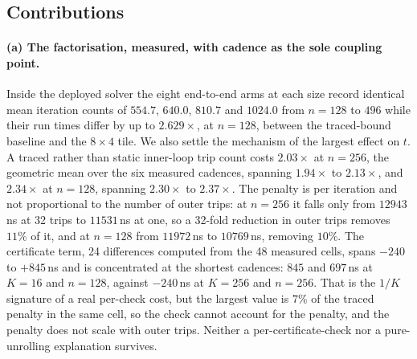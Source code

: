 \subsection{Contributions}
\label{sec:intro:contributions}

\paragraph{(a) The factorisation, measured, with cadence as the sole coupling
point.}
Inside the deployed solver the eight end-to-end arms at each size record
identical mean iteration counts of $554.7$, $640.0$, $810.7$ and $1024.0$ from
$n=128$ to $496$ while their run times differ by up to $2.629\times$, at
$n=128$, between the traced-bound baseline and the $8\times 4$ tile.
We also settle the mechanism of the largest effect on $t$. A traced rather than
static inner-loop trip count costs $2.03\times$ at $n=256$, the geometric mean
over the six measured cadences, spanning $1.94\times$ to $2.13\times$, and
$2.34\times$ at $n=128$, spanning $2.30\times$ to $2.37\times$. The penalty is
per iteration and not proportional to the number of outer trips: at $n=256$ it
falls only from $12943$\,ns at 32 trips to $11531$\,ns at one, so a 32-fold
reduction in outer trips removes $11\%$ of it, and at $n=128$ from $11972$\,ns
to $10769$\,ns, removing $10\%$. The certificate term, 24 differences computed
from the 48 measured cells, spans $-240$ to $+845$\,ns and is concentrated at
the shortest cadences: $845$ and $697$\,ns at $K=16$ and $n=128$, against
$-240$\,ns at $K=256$ and $n=256$. That is the $1/K$ signature of a real
per-check cost, but the largest value is $7\%$ of the traced penalty in the
same cell, so the check cannot account for the penalty, and the penalty does
not scale with outer trips. Neither a per-certificate-check nor a
pure-unrolling explanation survives.

